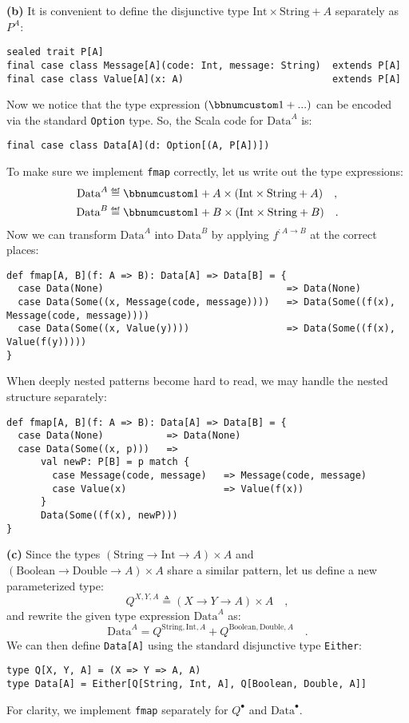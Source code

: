 \textbf{(b)} It is convenient to define the disjunctive type $\text{Int}\times\text{String}+A$
separately as $P^{A}$:
\begin{lstlisting}
sealed trait P[A]
final case class Message[A](code: Int, message: String)  extends P[A]
final case class Value[A](x: A)                          extends P[A]
\end{lstlisting}
Now we notice that the type expression $\left(\bbnum 1+...\right)$
can be encoded via the standard \lstinline!Option! type. So, the
Scala code for $\text{Data}^{A}$ is:
\begin{lstlisting}
final case class Data[A](d: Option[(A, P[A])])
\end{lstlisting}
To make sure we implement \lstinline!fmap! correctly, let us write
out the type expressions:
\begin{align*}
\text{Data}^{A} & \triangleq\bbnum 1+A\times(\text{Int}\times\text{String}+A)\quad,\\
\text{Data}^{B} & \triangleq\bbnum 1+B\times(\text{Int}\times\text{String}+B)\quad.
\end{align*}
Now we can transform $\text{Data}^{A}$ into $\text{Data}^{B}$ by
applying $f^{:A\rightarrow B}$ at the correct places:
\begin{lstlisting}
def fmap[A, B](f: A => B): Data[A] => Data[B] = {
  case Data(None)                                => Data(None)
  case Data(Some((x, Message(code, message))))   => Data(Some((f(x), Message(code, message))))
  case Data(Some((x, Value(y))))                 => Data(Some((f(x), Value(f(y)))))
}
\end{lstlisting}
When deeply nested patterns become hard to read, we may handle the
nested structure separately:
\begin{lstlisting}
def fmap[A, B](f: A => B): Data[A] => Data[B] = {
  case Data(None)           => Data(None)
  case Data(Some((x, p)))   =>
      val newP: P[B] = p match {
        case Message(code, message)   => Message(code, message)
        case Value(x)                 => Value(f(x))
      }
      Data(Some((f(x), newP)))
}
\end{lstlisting}

\textbf{(c)} Since the types $(\text{String}\rightarrow\text{Int}\rightarrow A)\times A$
and $(\text{Boolean}\rightarrow\text{Double}\rightarrow A)\times A$
share a similar pattern, let us define a new parameterized type:
\[
Q^{X,Y,A}\triangleq\left(X\rightarrow Y\rightarrow A\right)\times A\quad,
\]
and rewrite the given type expression $\text{Data}^{A}$ as:
\[
\text{Data}^{A}=Q^{\text{String},\text{Int},A}+Q^{\text{Boolean},\text{Double},A}\quad.
\]
We can then define \lstinline!Data[A]! using the standard disjunctive
type \lstinline!Either!: 
\begin{lstlisting}
type Q[X, Y, A] = (X => Y => A, A)
type Data[A] = Either[Q[String, Int, A], Q[Boolean, Double, A]]
\end{lstlisting}
For clarity, we implement \lstinline!fmap! separately for $Q^{\bullet}$
and $\text{Data}^{\bullet}$.

